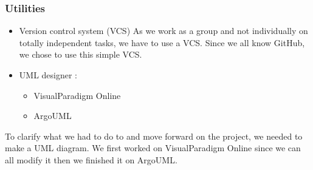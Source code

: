 \subsubsection{Utilities}

\begin{itemize}
    \item Version control system (VCS)
        As we work as a group and not individually on totally independent tasks, we have to use a VCS. Since we all know GitHub, we chose to use this simple VCS.
\end{itemize}

\begin{itemize}
    \item UML designer :
    \begin{itemize}
        \item VisualParadigm Online
        \item ArgoUML
    \end{itemize}
\end{itemize}
To clarify what we had to do to and move forward on the project, we needed to make a UML diagram. We first worked on VisualParadigm Online since we can all modify it then we finished it on ArgoUML.

